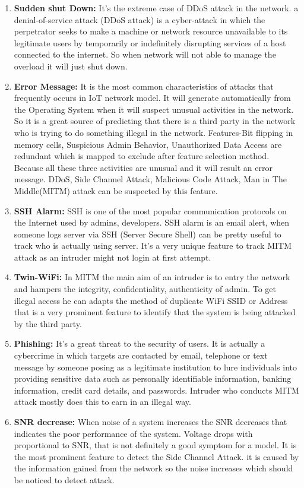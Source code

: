 \begin{enumerate}
\item \textbf{Sudden shut Down:} It’s the extreme case of DDoS attack in the network. a denial-of-service attack (DDoS attack) is a cyber-attack in which the perpetrator seeks to make a machine or network resource unavailable to its legitimate users by temporarily or indefinitely disrupting services of a host connected to the internet. So when network will not able to manage the overload it will just shut down.
\item \textbf{Error Message:} It is the most common characteristics of attacks that frequently occurs in IoT network model. It will generate automatically from the Operating System when it will suspect unusual activities in the network. So it is a great source of predicting that there is a third party in the network who is trying to do something illegal in the network. Features-Bit flipping in memory cells, Suspicious Admin Behavior, Unauthorized Data Access are redundant which is mapped to exclude after feature selection method. Because all these three activities are unusual and it will result an error message. DDoS, Side Channel Attack, Malicious Code Attack, Man in The Middle(MITM) attack can be suspected by this feature.
\item \textbf{	SSH Alarm:} SSH is one of the most popular communication protocols on the Internet used by admins, developers. SSH alarm is an email alert, when someone logs server via SSH (Server Secure Shell) can be pretty useful to track who is actually using server. It’s a very unique feature to track MITM attack as an intruder might not login at first attempt.
\item \textbf{Twin-WiFi:} In MITM the main aim of an intruder is to entry the network and hampers the integrity, confidentiality, authenticity of admin. To get illegal access he can adapts the method of duplicate WiFi SSID or Address that is a very prominent feature to identify that the system is being attacked by the third party.
\item \textbf{Phishing:} It’s a great threat to the security of users. It is actually a cybercrime in which targets are contacted by email, telephone or text message by someone posing as a legitimate institution to lure individuals into providing sensitive data such as personally identifiable information, banking information, credit card details, and passwords. Intruder who conducts MITM attack mostly does this to earn in an illegal way.
\item \textbf{SNR decrease:} When noise of a system increases the SNR decreases that indicates the poor performance of the system. Voltage drops with proportional to SNR, that is not definitely a good symptom for a model. It is the most prominent feature to detect the Side Channel Attack. it is caused by the information gained from the network so the noise increases which should be noticed to detect attack.

\end{enumerate}
